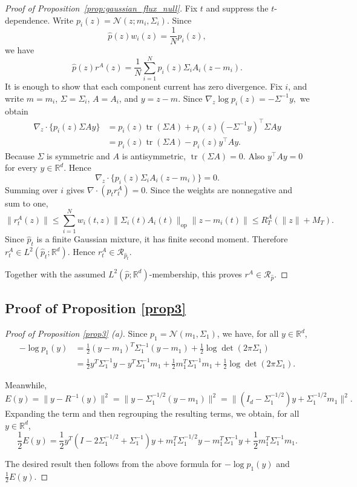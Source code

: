 \documentclass[a4paper,11pt]{article}
\newcommand{\R}{\mathbb{R}}
\theoremstyle{plain}
\theoremstyle{definition}
\begin{document}
\begin{proof}[Proof of Proposition~\ref{prop:gaussian_flux_null}]
Fix \(t\) and suppress the \(t\)-dependence. Write
\(p_i(z)=\mathcal N(z;m_i,\Sigma_i)\). Since
\[
    \hat p(z)w_i(z)=\frac1N p_i(z),
\]
we have
\[
    \hat p(z)r^A(z)
    =
    \frac1N
    \sum_{i=1}^N
    p_i(z)\Sigma_iA_i(z-m_i).
\]
It is enough to show that each component current has zero divergence. Fix
\(i\), and write \(m=m_i\), \(\Sigma=\Sigma_i\), \(A=A_i\), and \(y=z-m\).
Since
\(
    \nabla_z\log p_i(z)=-\Sigma^{-1}y,
\)
we obtain
\[
\begin{aligned}
    \nabla_z\cdot\{p_i(z)\Sigma A y\}
    &=
    p_i(z)\operatorname{tr}(\Sigma A)
    +
    p_i(z)(-\Sigma^{-1}y)^\top\Sigma A y \\
    &=
    p_i(z)\operatorname{tr}(\Sigma A)
    -
    p_i(z)y^\top A y.
\end{aligned}
\]
Because \(\Sigma\) is symmetric and \(A\) is antisymmetric,
\(\operatorname{tr}(\Sigma A)=0\). Also \(y^\top Ay=0\) for every
\(y\in\mathbb R^d\). Hence
\[
    \nabla_z\cdot\{p_i(z)\Sigma_iA_i(z-m_i)\}=0.
\]
Summing over \(i\) gives
\(
    \nabla\cdot(\hat p_t r_t^A)=0.
\)
Since the weights
are nonnegative and sum to one,
\[
    \|r_t^A(z)\|
    \le
    \sum_{i=1}^N
    w_i(t,z)\|\Sigma_i(t)A_i(t)\|_{\mathrm{op}}\|z-m_i(t)\|
    \le
    R_T^A(\|z\|+M_T).
\]
Since \(\hat p_t\) is a finite Gaussian mixture, it has finite second moment.
Therefore \(r_t^A\in L^2(\hat p_t;\mathbb R^d)\). Hence
\(r_t^A\in\mathcal R_{\hat p_t}\).

Together with the assumed \(L^2(\hat p;\mathbb R^d)\)-membership, this proves
\(r^A\in\mathcal R_{\hat p}\).
\end{proof}

\subsection{Proof of Proposition \ref{prop3}}


\begin{proof}[Proof of Proposition \ref{prop3} (a)]
Since $p_1 = \mathcal{N}(m_1, \Sigma_1)$, we have, for all $y \in \R^d$,
\begin{align}
- \log p_1(y) &= \frac{1}{2} (y - m_1)^T \Sigma_1^{-1} (y-m_1) + \frac{1}{2} \log \det (2 \pi \Sigma_1) \\
&= \frac{1}{2} y^T \Sigma_1^{-1} y - y^T \Sigma_1^{-1} m_1 + \frac{1}{2} m_1^T \Sigma_1^{-1} m_1 + \frac{1}{2} \log \det (2 \pi \Sigma_1).
\end{align}

Meanwhile, $E(y) = \|y-R^{-1}(y)\|^2 =  \|y- \Sigma_1^{-1/2}(y-m_1) \|^2 = \| (I_d - \Sigma_1^{-1/2})y + \Sigma_1^{-1/2} m_1 \|^2.$ Expanding the term and then regrouping the resulting terms, we obtain, for all $y \in \R^d$, 
$$\frac{1}{2} E(y) = \frac{1}{2} y^T(I-2 \Sigma_1^{-1/2} + \Sigma_1^{-1}) y + m_1^T \Sigma_1^{-1/2} y - m_1^T \Sigma_1^{-1} y + \frac{1}{2} m_1^T \Sigma_1^{-1} m_1.$$

The desired result then follows from the above formula for $-\log p_1(y)$ and $\frac{1}{2} E(y)$. 
\end{proof}
\end{document}
